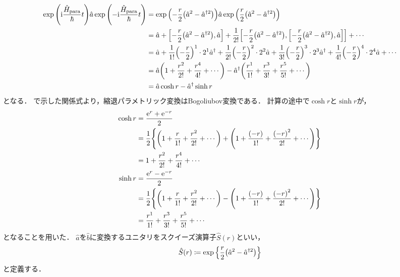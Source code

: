 \documentclass{report}
\begin{document}
    \begin{align}
      \exp\qty(\mathrm{i}\frac{\hat{H}_{\mathrm{para}}}{\hbar}t)\hat{a}\exp\qty(-\mathrm{i}\frac{\hat{H}_{\mathrm{para}}}{\hbar}t) &= \exp\qty(-\frac{r}{2}\qty(\hat{a}^2 - \hat{a}^{\dag 2}))\hat{a}\exp\qty(\frac{r}{2}\qty(\hat{a}^2 - \hat{a}^{\dag 2})) \\ 
      &= \hat{a} + \qty[-\frac{r}{2}\qty(\hat{a}^2 - \hat{a}^{\dag 2}), \hat{a}] + \frac{1}{2!}\qty[-\frac{r}{2}\qty(\hat{a}^2 - \hat{a}^{\dag 2}), \qty[-\frac{r}{2}\qty(\hat{a}^2 - \hat{a}^{\dag 2}), \hat{a}]] + \cdots \\ 
      &= \hat{a} + \frac{1}{1!}\qty(-\frac{r}{2})^1\cdot 2^1\hat{a}^{\dag} + \frac{1}{2!}\qty(-\frac{r}{2})^2\cdot 2^2\hat{a} + \frac{1}{3!}\qty(-\frac{r}{2})^3\cdot 2^3\hat{a}^{\dag} + \frac{1}{4!}\qty(-\frac{r}{2})^4\cdot 2^4\hat{a} + \cdots \\ 
      &= \hat{a}\qty(1 + \frac{r^2}{2!} + \frac{r^4}{4!} + \cdots) - \hat{a}^{\dag}\qty(\frac{r^1}{1!} + \frac{r^3}{3!} + \frac{r^5}{5!} + \cdots) \\ 
      &= \hat{a}\cosh r - \hat{a}^{\dag}\sinh r
    \end{align}
    となる．
    で示した関係式より，縮退パラメトリック変換はBogoliubov変換である．
    計算の途中で$\cosh r$と$\sinh r$が，
    \begin{align}
      \cosh r &= \frac{\mathrm{e}^r + \mathrm{e}^{-r}}{2} \\ 
      &= \frac{1}{2}\qty{\qty(1 + \frac{r}{1!} + \frac{r^2}{2!} + \cdots) + \qty(1 + \frac{\qty(-r)}{1!} + \frac{\qty(-r)^2}{2!} + \cdots)} \\ 
      &= 1 + \frac{r^2}{2!} + \frac{r^4}{4!} + \cdots \\ 
      \sinh r &= \frac{\mathrm{e}^r - \mathrm{e}^{-r}}{2} \\ 
      &= \frac{1}{2}\qty{\qty(1 + \frac{r}{1!} + \frac{r^2}{2!} + \cdots) - \qty(1 + \frac{\qty(-r)}{1!} + \frac{\qty(-r)^2}{2!} + \cdots)} \\ 
      &= \frac{r^1}{1!} + \frac{r^3}{3!} + \frac{r^5}{5!} + \cdots \\
    \end{align}
    となることを用いた．
    $\hat{a}$を$\hat{b}$に変換するユニタリをスクイーズ演算子$\hat{S}(r)$といい，
    \begin{align}
      \hat{S}(r) \coloneqq \exp\qty{\frac{r}{2}\qty(\hat{a}^2 - \hat{a}^{\dag 2})}
    \end{align}
    と定義する．
\end{document}
